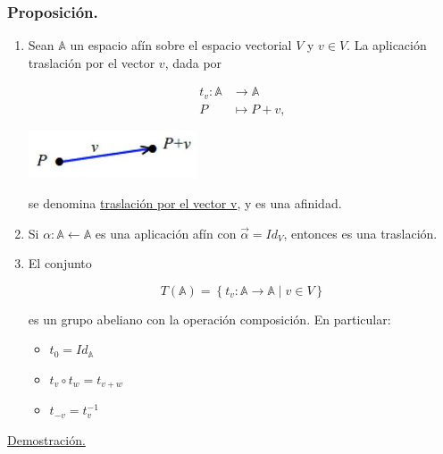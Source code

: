 \documentclass[12pt, a4paper, ones, notitlepage, openany,titlepage]{article}
\begin{document}
\subsubsection{Proposición.}
\begin{enumerate}
\item Sean $\mathbb{A}$ un espacio afín sobre el espacio vectorial $V$ y $v \in V$. La aplicación traslación por el vector $v$, dada por

$$
\begin{aligned}
t_{v}: \mathbb{A} & \longrightarrow \mathbb{A} \\
P & \longmapsto P+v,
\end{aligned}
$$

\begin{center}
\includegraphics[max width=5cm]{2023_03_01_7659aec5e35f9a9b2d3cg-22}
\end{center}

se denomina \underline{traslación por el vector v}, y es una afinidad.

\item Si $\alpha:\mathbb{A}\longleftarrow\mathbb{A}$ es una aplicación afín con $\vec{\alpha}=Id_{V}$, entonces es una traslación.

\item El conjunto

$$
T(\mathbb{A})=\left\{t_{v}: \mathbb{A} \rightarrow \mathbb{A} \mid v \in V\right\}
$$

es un grupo abeliano con la operación composición. En particular:
\begin{itemize}
\item $t_{0} = Id_{\mathbb{A}}$
\item $t_{v}\circ t_{w} = t_{v+w}$
\item $t_{-v} = t_{v}^{-1}$
\end{itemize}

\end{enumerate}
\underline{Demostración.}
\end{document}
